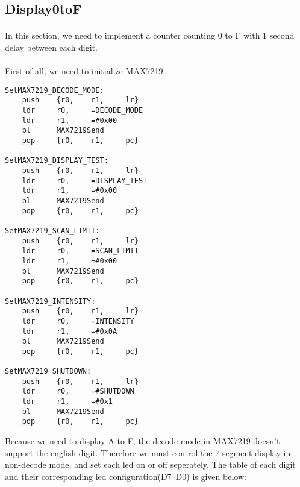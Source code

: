 \subsection{Display0toF}
\paragraph{}
In this section, we need to implement a counter counting 0 to F with 1 second delay between each digit. 
\paragraph{}
First of all, we need to initialize MAX7219.
\begin{lstlisting}
SetMAX7219_DECODE_MODE:
    push    {r0,    r1,     lr}
    ldr     r0,     =DECODE_MODE
    ldr     r1,     =#0x00
    bl      MAX7219Send
    pop     {r0,    r1,     pc}

SetMAX7219_DISPLAY_TEST:
    push    {r0,    r1,     lr}
    ldr     r0,     =DISPLAY_TEST
    ldr     r1,     =#0x00
    bl      MAX7219Send
    pop     {r0,    r1,     pc}

SetMAX7219_SCAN_LIMIT:
    push    {r0,    r1,     lr}
    ldr     r0,     =SCAN_LIMIT
    ldr     r1,     =#0x00
    bl      MAX7219Send
    pop     {r0,    r1,     pc}

SetMAX7219_INTENSITY:
    push    {r0,    r1,     lr}
    ldr     r0,     =INTENSITY
    ldr     r1,     =#0x0A
    bl      MAX7219Send
    pop     {r0,    r1,     pc}

SetMAX7219_SHUTDOWN:
    push    {r0,    r1,     lr}
    ldr     r0,     =#SHUTDOWN
    ldr     r1,     =#0x1
    bl      MAX7219Send
    pop     {r0,    r1,     pc}
\end{lstlisting}
Because we need to display A to F, the decode mode in MAX7219 doesn't support the english digit. Therefore we must control the 7 segment display in non-decode mode, and set each led on or off seperately.
The table of each digit and their corresponding led configuration(D7~D0) is given below:

